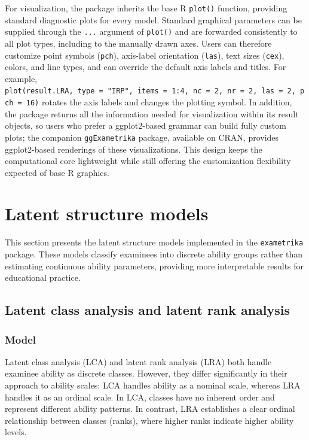 For visualization, the package inherits the base R \texttt{plot()} function, providing standard diagnostic plots for every model. Standard graphical parameters can be supplied through the \texttt{...} argument of \texttt{plot()} and are forwarded consistently to all plot types, including to the manually drawn axes. Users can therefore customize point symbols (\texttt{pch}), axis-label orientation (\texttt{las}), text sizes (\texttt{cex}), colors, and line types, and can override the default axis labels and titles. For example, \texttt{plot(result.LRA,\ type\ =\ "IRP",\ items\ =\ 1:4,\ nc\ =\ 2,\ nr\ =\ 2,\ las\ =\ 2,\ pch\ =\ 16)} rotates the axis labels and changes the plotting symbol. In addition, the package returns all the information needed for visualization within its result objects, so users who prefer a ggplot2-based grammar can build fully custom plots; the companion \texttt{ggExametrika} package, available on CRAN, provides ggplot2-based renderings of these visualizations. This design keeps the computational core lightweight while still offering the customization flexibility expected of base R graphics.

\section{Latent structure models}\label{latent-structure-models}

This section presents the latent structure models implemented in the \texttt{exametrika} package. These models classify examinees into discrete ability groups rather than estimating continuous ability parameters, providing more interpretable results for educational practice.

\subsection{Latent class analysis and latent rank analysis}\label{latent-class-analysis-and-latent-rank-analysis}

\subsubsection{Model}\label{model}

Latent class analysis (LCA) and latent rank analysis (LRA) both handle examinee ability as discrete classes. However, they differ significantly in their approach to ability scales: LCA handles ability as a nominal scale, whereas LRA handles it as an ordinal scale. In LCA, classes have no inherent order and represent different ability patterns. In contrast, LRA establishes a clear ordinal relationship between classes (ranks), where higher ranks indicate higher ability levels.


